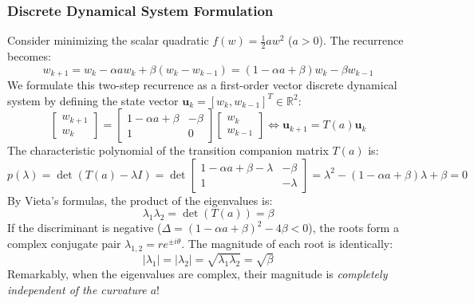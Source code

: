 \subsubsection{Discrete Dynamical System Formulation}
Consider minimizing the scalar quadratic $f(w) = \frac{1}{2} a w^2$ ($a > 0$). The recurrence becomes:
\begin{equation}
w_{k+1} = w_k - \alpha a w_k + \beta(w_k - w_{k-1}) = (1 - \alpha a + \beta) w_k - \beta w_{k-1}
\end{equation}
We formulate this two-step recurrence as a first-order vector discrete dynamical system by defining the state vector $\mathbf{u}_k = [w_k, w_{k-1}]^T \in \mathbb{R}^2$:
\begin{equation}
\begin{bmatrix} w_{k+1} \\ w_k \end{bmatrix} = \begin{bmatrix} 1 - \alpha a + \beta & -\beta \\ 1 & 0 \end{bmatrix} \begin{bmatrix} w_k \\ w_{k-1} \end{bmatrix} \iff \mathbf{u}_{k+1} = T(a) \mathbf{u}_k
\label{eq:momentum_system}
\end{equation}
The characteristic polynomial of the transition companion matrix $T(a)$ is:
\begin{equation}
p(\lambda) = \det(T(a) - \lambda I) = \det \begin{bmatrix} 1 - \alpha a + \beta - \lambda & -\beta \\ 1 & -\lambda \end{bmatrix} = \lambda^2 - (1 - \alpha a + \beta)\lambda + \beta = 0
\end{equation}
By Vieta's formulas, the product of the eigenvalues is:
\begin{equation}
\lambda_1 \lambda_2 = \det(T(a)) = \beta
\end{equation}
If the discriminant is negative ($\Delta = (1 - \alpha a + \beta)^2 - 4\beta < 0$), the roots form a complex conjugate pair $\lambda_{1, 2} = r e^{\pm i \theta}$. The magnitude of each root is identically:
\begin{equation}
|\lambda_1| = |\lambda_2| = \sqrt{\lambda_1 \lambda_2} = \sqrt{\beta}
\end{equation}
Remarkably, when the eigenvalues are complex, their magnitude is \emph{completely independent of the curvature $a$}!
